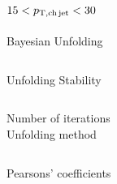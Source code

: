 \documentclass[xcolor={usenames,dvipsnames}]{beamer}
\begin{document}
\subsection{$15<p_{\mathrm{T,ch\, jet}}<30$~\GeVc}

\begin{frame}{Bayesian Unfolding}
\begin{columns}
\centering
\centering
\end{columns}
\end{frame}

\begin{frame}{Unfolding Stability}
\begin{columns}
\centering
\tiny 
Number of iterations\\
\centering
\tiny
Unfolding method\\
\end{columns}
\centering
\tiny
Pearsons' coefficients\\
\end{frame}
\end{document}
